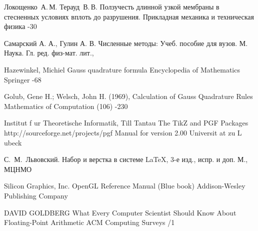 \begin{thebibliography}{2013}
\label{teraud}
	\by Локощенко~А.\,М. Терауд~В.\,В. 
	\paper Ползучесть длинной узкой мембраны в стесненных условиях вплоть до разрушения.
	\jour Прикладная механика и техническая физика	
	-30

  \label{samarskiy} 
\by Самарский А. А., Гулин А. В. 
\book Численные методы: Учеб. пособие для вузов.
\publaddr М. Наука. Гл. ред. физ-мат. лит.,

\label{gauss_book}
 \by Hazewinkel, Michiel
 \paper Gauss quadrature formula
 \jour Encyclopedia of Mathematics
 \publaddr Springer
 -68
 
\label{gauss_article}
  \by Golub, Gene H.; Welsch, John H. (1969), 
  \paper Calculation of Gauss Quadrature Rules
  \jour Mathematics of Computation
   (106)
  -230

\label{tikz-manual}
 \by Institut f ur Theoretische Informatik, Till Tantau
 \book The TikZ and PGF Packages http://sourceforge.net/projects/pgf Manual for version 2.00
 \publ Universit at zu L ubeck

\by С.~М.~Львовский.
\book Набор и верстка в системе \LaTeX, 3-е изд., испр. и доп.
\publaddr М., МЦНМО

\label{opengl-manual}
 \by Silicon Graphics, Inc.
 \book OpenGL Reference Manual (Blue book)
 \publ Addison-Wesley Publishing Company

\label{float-point}
\by DAVID GOLDBERG
\paper What Every Computer Scientist Should Know About Floating-Point Arithmetic
\publ ACM Computing Surveys
/1

\end{thebibliography}

\endinput
